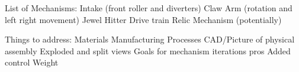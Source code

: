 List of Mechanisms:
Intake (front roller and diverters)
Claw
Arm (rotation and left right movement)
Jewel Hitter
Drive train
Relic Mechanism (potentially)

Things to address:
Materials
Manufacturing Processes 
CAD/Picture of physical assembly
Exploded and split views
Goals for mechanism
iterations
pros
Added control
Weight


